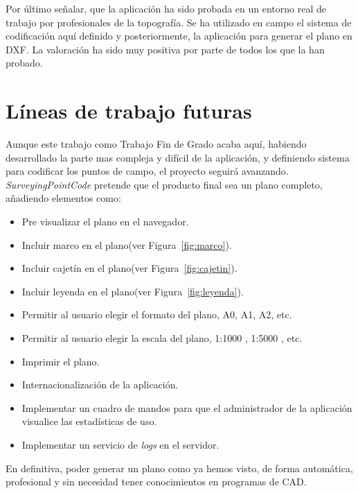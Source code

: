 Por último señalar, que la aplicación ha sido probada en un entorno real de trabajo por profesionales de la topografía. Se ha utilizado en campo el sistema de codificación aquí definido y posteriormente, la aplicación para generar el plano en DXF. La valoración ha sido muy positiva por parte de todos los que la han probado.

\section{Líneas de trabajo futuras}

Aunque este trabajo como Trabajo Fin de Grado acaba aquí, habiendo desarrollado la parte mas compleja y difícil de la aplicación, y definiendo sistema para codificar los puntos de campo, el proyecto seguirá avanzando. \emph{SurveyingPointCode} pretende que el producto final sea un plano completo, añadiendo elementos como:



\begin{itemize}
\item Pre visualizar el plano en el navegador.
\item Incluir marco en el plano(ver Figura~\ref{fig:marco}).
\item Incluir cajetín en el plano(ver Figura~\ref{fig:cajetin}).
\item Incluir leyenda en el plano(ver Figura~\ref{fig:leyenda}).
\item Permitir al usuario elegir el formato del plano, A0, A1, A2, etc.
\item Permitir al usuario elegir la escala del plano, 1:1000 , 1:5000 , etc.
\item Imprimir el plano.
\item Internacionalización de la aplicación.
\item Implementar un cuadro de mandos para que el administrador de la aplicación visualice las estadísticas de uso.
\item Implementar un servicio de \emph{logs} en el servidor.
\end{itemize}


En definitiva, poder generar un plano como ya hemos visto, de forma automática, profesional y sin necesidad tener conocimientos en programas de CAD.
